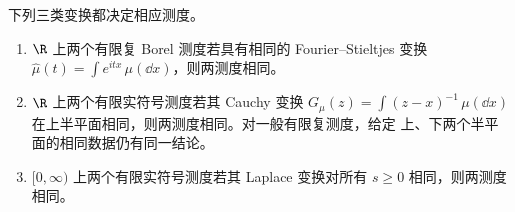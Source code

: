 \begin{theorem}[变换唯一性链]\label{theorem:7-3-3-1}
下列三类变换都决定相应测度。
\begin{enumerate}
  \item $\R$ 上两个有限复 Borel 测度若具有相同的 Fourier--Stieltjes 变换
  $\widehat\mu(t)=\int e^{itx}\,\mu(\dd x)$，则两测度相同。
  \item $\R$ 上两个有限实符号测度若其 Cauchy 变换
  $G_\mu(z)=\int(z-x)^{-1}\,\mu(\dd x)$ 在上半平面相同，则两测度相同。对一般有限复测度，给定
  上、下两个半平面的相同数据仍有同一结论。
  \item $[0,\infty)$ 上两个有限实符号测度若其 Laplace 变换对所有 $s\geq0$ 相同，则两测度
  相同。
\end{enumerate}
\end{theorem}

